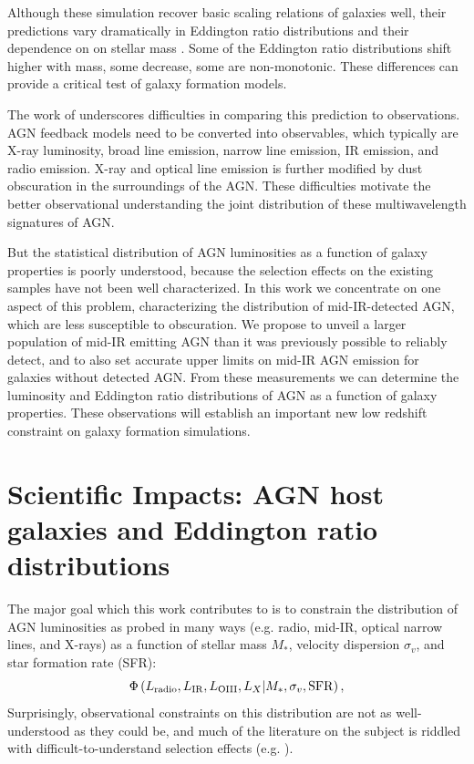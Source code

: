\documentclass[12pt, preprint]{hacked-aastex}
\begin{document}
Although these simulation recover basic scaling relations of galaxies
well, their predictions vary dramatically in Eddington ratio
distributions and their dependence on on stellar mass
\cite{habouzit22a}. Some of the Eddington ratio distributions shift
higher with mass, some decrease, some are non-monotonic.  These
differences can provide a critical test of galaxy formation models.

The work of \cite{habouzit22a} underscores difficulties in comparing
this prediction to observations. AGN feedback models need to be
converted into observables, which typically are X-ray luminosity,
broad line emission, narrow line emission, IR emission, and radio
emission. X-ray and optical line emission is further modified by dust
obscuration in the surroundings of the AGN. These difficulties
motivate the better observational understanding the joint distribution
of these multiwavelength signatures of AGN.

But the statistical distribution of AGN luminosities as a function of
galaxy properties is poorly understood, because the selection effects
on the existing samples have not been well characterized. In this work
we concentrate on one aspect of this problem, characterizing the
distribution of mid-IR-detected AGN, which are less susceptible to
obscuration.  We propose to unveil a larger population of mid-IR
emitting AGN than it was previously possible to reliably detect, and
to also set accurate upper limits on mid-IR AGN emission for galaxies
without detected AGN. From these measurements we can determine the
luminosity and Eddington ratio distributions of AGN as a function of
galaxy properties.  These observations will establish an important new
low redshift constraint on galaxy formation simulations.

\section{Scientific Impacts: AGN host galaxies and Eddington ratio distributions}\label{sec:impacts}


The major goal which this work contributes to is to constrain the
distribution of AGN luminosities as probed in many ways (e.g. radio,
mid-IR, optical narrow lines, and X-rays) as a function of stellar
mass $M_\ast$, velocity dispersion $\sigma_v$, and star formation rate
(SFR):
\begin{equation}
\label{eq:model}
\Phi\left(L_{\rm radio}, L_{\rm IR}, L_{\rm OIII}, L_X | M_\ast, \sigma_v, {\rm SFR}\right),
\end{equation}
Surprisingly, observational constraints on this distribution are not
as well-understood as they could be, and much of the literature on the
subject is riddled with difficult-to-understand selection effects
(e.g. \cite{trump15a, jones17a, hviding22a}).
\end{document}
